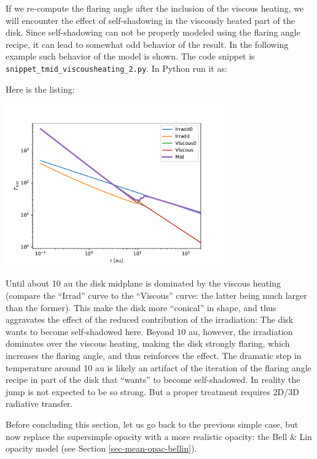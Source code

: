 \documentclass{book}
\newcommand{\code}[1]{{\small\tt #1}}
\begin{document}
If we re-compute the flaring angle after the inclusion of the viscous heating,
we will encounter the effect of self-shadowing in the viscously heated part of
the disk. Since self-shadowing can not be properly modeled using the flaring
angle recipe, it can lead to somewhat odd behavior of the result. In the
following example such behavior of the model is shown. The code snippet is
\code{snippet\_tmid\_viscousheating\_2.py}. In Python run it as:
\begin{codebox}
\end{codebox}
Here is the listing:

\centerline{\includegraphics[width=0.7\textwidth]{../snippets/fig_snippet_tmid_viscousheating_2_1.pdf}}
Until about 10 au the disk midplane is dominated by the viscous heating
(compare the ``Irrad'' curve to the ``Viscous'' curve: the latter being much
larger than the former). This make the disk more ``conical'' in shape, and
thus aggravates the effect of the reduced contribution of the irradiation:
The disk wants to become self-shadowed here. Beyond 10 au, however, the
irradiation dominates over the viscous heating, making the disk strongly
flaring, which increases the flaring angle, and thus reinforces the effect.
The dramatic step in temperature around 10 au is likely an artifact of the
iteration of the flaring angle recipe in part of the disk that ``wants'' to
become self-shadowed. In reality the jump is not expected to be so strong.
But a proper treatment requires 2D/3D radiative transfer.

Before concluding this section, let us go back to the previous simple
case, but now replace the supersimple opacity with a more realistic opacity:
the Bell \& Lin opacity model (see Section \ref{sec-mean-opac-bellin}).
\end{document}
